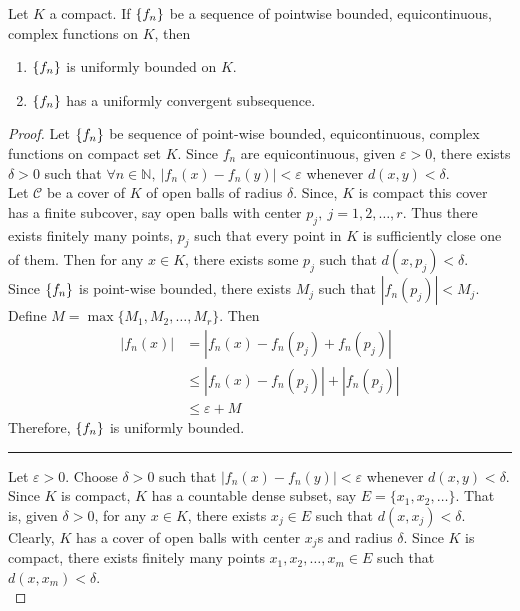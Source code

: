 \begin{theorem}
	Let $K$ a compact.
	If $\left\{f_n\right\}$ be a sequence of pointwise bounded, equicontinuous, complex functions on $K$, then
	\begin{enumerate}
		\item $\left\{f_n\right\}$ is uniformly bounded on $K$.
		\item $\left\{f_n\right\}$ has a uniformly convergent subsequence.
	\end{enumerate}
\end{theorem}
\begin{proof}
	Let $\left\{f_n\right\}$ be sequence of point-wise bounded, equicontinuous, complex functions on compact set $K$.
	Since $f_n$ are equicontinuous, given $\varepsilon > 0$, there exists $\delta > 0$ such that $\forall n \in \mathbb{N},\ |f_n(x)-f_n(y)| < \varepsilon$ whenever $d(x,y) < \delta$.\\

	Let $\mathcal{C}$ be a cover of $K$ of open balls of radius $\delta$.
	Since, $K$ is compact this cover has a finite subcover, say open balls with center $p_j,\ j = 1,2,\dots,r$.
	Thus there exists finitely many points, $p_j$ such that every point in $K$ is sufficiently close one of them.
	Then for any $x \in K$, there exists some $p_j$ such that $d(x,p_j) < \delta$.\\

	Since $\left\{f_n\right\}$ is point-wise bounded, there exists $M_j$ such that $|f_n(p_j)| < M_j$.
	Define $M = \max \{ M_1, M_2, \dots, M_r\}$. 
	Then 
	\begin{align*}
		|f_n(x)| & = |f_n(x)-f_n(p_j)+f_n(p_j)| \\
		& \le |f_n(x) - f_n(p_j)| + |f_n(p_j)| \\
		& \le \varepsilon + M
	\end{align*}
	Therefore, $\left\{f_n\right\}$ is uniformly bounded.\\

	\hrule \vspace{1em}

	Let $\varepsilon > 0$.
	Choose $\delta > 0$ such that $|f_n(x)-f_n(y)| < \varepsilon$ whenever $d(x,y) < \delta$.
	Since $K$ is compact, $K$ has a countable dense subset, say $E = \{x_1,x_2,\dots\}$.
	That is, given $\delta > 0$, for any $x \in K$, there exists $x_j \in E$ such that $d(x,x_j) < \delta$.
	Clearly, $K$ has a cover of open balls with center $x_j$s and radius $\delta$.
	Since $K$ is compact, there exists finitely many points $x_1,x_2,\dots,x_m \in E$ such that $d(x,x_m) < \delta$.\\


\end{proof}

